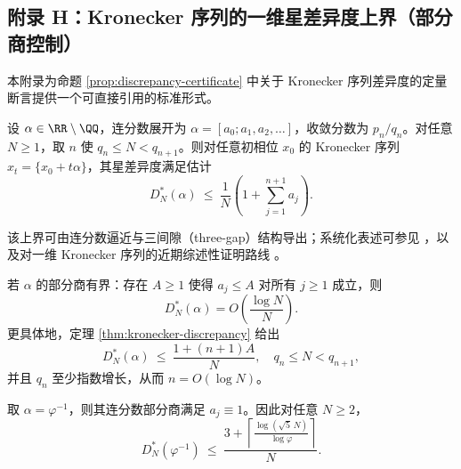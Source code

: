\subsection{附录 H：Kronecker 序列的一维星差异度上界（部分商控制）}\label{app:kronecker-discrepancy}

本附录为命题 \ref{prop:discrepancy-certificate} 中关于 Kronecker 序列差异度的定量断言提供一个可直接引用的标准形式。

\begin{theorem}[部分商控制的差异度上界]\label{thm:kronecker-discrepancy}
设 $\alpha\in\RR\setminus\QQ$，连分数展开为 $\alpha=[a_0;a_1,a_2,\dots]$，收敛分数为 $p_n/q_n$。对任意 $N\ge 1$，取 $n$ 使 $q_n\le N<q_{n+1}$。则对任意初相位 $x_0$ 的 Kronecker 序列 $x_t=\{x_0+t\alpha\}$，其星差异度满足估计
\[
D_N^*(\alpha)\ \le\ \frac{1}{N}\left(1+\sum_{j=1}^{n+1}a_j\right).
\]
\end{theorem}

\begin{remark}
该上界可由连分数逼近与三间隙（three-gap）结构导出；系统化表述可参见 \cite{KuipersNiederreiter1974}，以及对一维 Kronecker 序列的近期综述性证明路线 \cite{Goda2024QuasiUniformKronecker}。
\end{remark}

\begin{corollary}\label{cor:kronecker-discrepancy-const-type}
若 $\alpha$ 的部分商有界：存在 $A\ge 1$ 使得 $a_j\le A$ 对所有 $j\ge 1$ 成立，则
\[
D_N^*(\alpha)=O\!\left(\frac{\log N}{N}\right).
\]
更具体地，定理 \ref{thm:kronecker-discrepancy} 给出
\[
D_N^*(\alpha)\ \le\ \frac{1+(n+1)A}{N},
\quad
q_n\le N<q_{n+1},
\]
并且 $q_n$ 至少指数增长，从而 $n=O(\log N)$。
\end{corollary}

\begin{corollary}[黄金分支的显式上界]\label{cor:kronecker-discrepancy-golden}
取 $\alpha=\varphi^{-1}$，则其连分数部分商满足 $a_j\equiv 1$。因此对任意 $N\ge 2$，
\[
D_N^*(\varphi^{-1})\ \le\ \frac{3+\left\lceil \frac{\log(\sqrt5\,N)}{\log \varphi}\right\rceil}{N}.
\]
\end{corollary}
